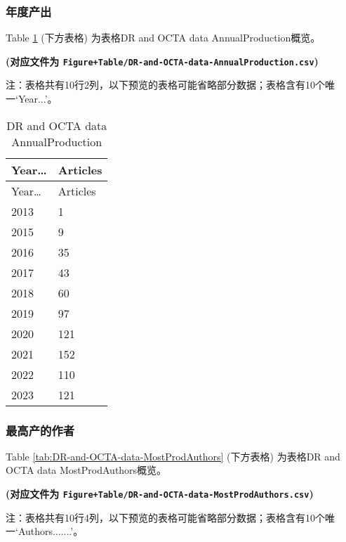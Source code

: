 \documentclass[
]{article}
\begin{document}
\hypertarget{ux5e74ux5ea6ux4ea7ux51fa}{%
\subsubsection{年度产出}\label{ux5e74ux5ea6ux4ea7ux51fa}}

Table \ref{tab:DR-and-OCTA-data-AnnualProduction} (下方表格) 为表格DR and OCTA data AnnualProduction概览。

\textbf{(对应文件为 \texttt{Figure+Table/DR-and-OCTA-data-AnnualProduction.csv})}

\begin{center}\begin{tcolorbox}[colback=gray!10, colframe=gray!50, width=0.9\linewidth, arc=1mm, boxrule=0.5pt]注：表格共有10行2列，以下预览的表格可能省略部分数据；表格含有10个唯一`Year...'。
\end{tcolorbox}
\end{center}

\begin{longtable}[]{@{}ll@{}}
\caption{\label{tab:DR-and-OCTA-data-AnnualProduction}DR and OCTA data AnnualProduction}\tabularnewline
\toprule
Year\ldots{} & Articles\tabularnewline
\midrule
\endfirsthead
\toprule
Year\ldots{} & Articles\tabularnewline
\midrule
\endhead
2013 & 1\tabularnewline
2015 & 9\tabularnewline
2016 & 35\tabularnewline
2017 & 43\tabularnewline
2018 & 60\tabularnewline
2019 & 97\tabularnewline
2020 & 121\tabularnewline
2021 & 152\tabularnewline
2022 & 110\tabularnewline
2023 & 121\tabularnewline
\bottomrule
\end{longtable}

\hypertarget{ux6700ux9ad8ux4ea7ux7684ux4f5cux8005}{%
\subsubsection{最高产的作者}\label{ux6700ux9ad8ux4ea7ux7684ux4f5cux8005}}

Table \ref{tab:DR-and-OCTA-data-MostProdAuthors} (下方表格) 为表格DR and OCTA data MostProdAuthors概览。

\textbf{(对应文件为 \texttt{Figure+Table/DR-and-OCTA-data-MostProdAuthors.csv})}

\begin{center}\begin{tcolorbox}[colback=gray!10, colframe=gray!50, width=0.9\linewidth, arc=1mm, boxrule=0.5pt]注：表格共有10行4列，以下预览的表格可能省略部分数据；表格含有10个唯一`Authors.......'。
\end{tcolorbox}
\end{center}
\end{document}
